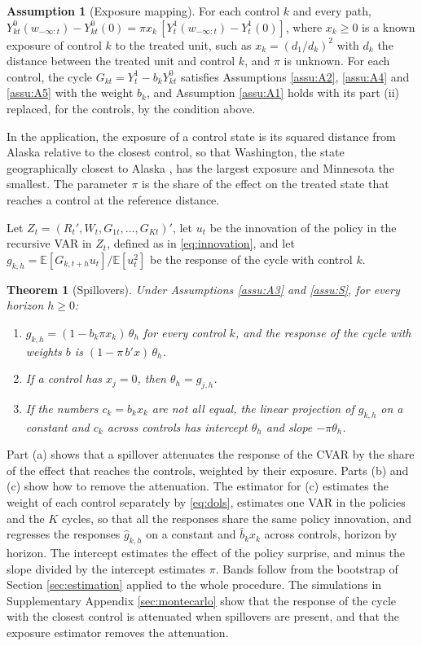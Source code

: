 \documentclass[12pt,a4paper]{article}
\newtheorem{thm}{Theorem}
\theoremstyle{definition}
\newtheorem{assumption}{Assumption}
\newcommand{\E}{\mathbb{E}}
\begin{document}
\begin{assumption}[Exposure mapping\label{assu:S}]
For each control $k$ and every path, $Y^0_{kt}(w_{-\infty:t})-Y^0_{kt}(0)=\pi x_k\,[Y^1_t(w_{-\infty:t})-Y^1_t(0)]$, where $x_k\geq0$ is a known exposure of control $k$ to the treated unit, such as $x_k=(d_1/d_k)^2$ with $d_k$ the distance between the treated unit and control $k$, and $\pi$ is unknown. For each control, the cycle $G_{kt}=Y^1_t-b_kY^0_{kt}$ satisfies Assumptions \ref{assu:A2}, \ref{assu:A4} and \ref{assu:A5} with the weight $b_k$, and Assumption \ref{assu:A1} holds with its part (ii) replaced, for the controls, by the condition above.
\end{assumption}

In the application, the exposure of a control state is its squared distance from Alaska relative to the closest control, so that Washington, the state geographically closest to Alaska \citep{Kueng2018}, has the largest exposure and Minnesota the smallest. The parameter $\pi$ is the share of the effect on the treated state that reaches a control at the reference distance.

Let $Z_t=(R_t',W_t,G_{1t},\dots,G_{Kt})'$, let $u_t$ be the innovation of the policy in the recursive VAR in $Z_t$, defined as in \eqref{eq:innovation}, and let $g_{k,h}=\E[G_{k,t+h}u_t]/\E[u_t^2]$ be the response of the cycle with control $k$.

\begin{thm}[Spillovers\label{thm:spill}]
Under Assumptions \ref{assu:A3} and \ref{assu:S}, for every horizon $h\geq0$:
\begin{enumerate}
\item[(a)] $g_{k,h}=(1-b_k\pi x_k)\,\theta_h$ for every control $k$, and the response of the cycle with weights $b$ is $(1-\pi\,b'x)\,\theta_h$.
\item[(b)] If a control has $x_j=0$, then $\theta_h=g_{j,h}$.
\item[(c)] If the numbers $c_k=b_kx_k$ are not all equal, the linear projection of $g_{k,h}$ on a constant and $c_k$ across controls has intercept $\theta_h$ and slope $-\pi\theta_h$.
\end{enumerate}
\end{thm}

Part (a) shows that a spillover attenuates the response of the CVAR by the share of the effect that reaches the controls, weighted by their exposure. Parts (b) and (c) show how to remove the attenuation. The estimator for (c) estimates the weight of each control separately by \eqref{eq:dols}, estimates one VAR in the policies and the $K$ cycles, so that all the responses share the same policy innovation, and regresses the responses $\hat g_{k,h}$ on a constant and $\hat b_kx_k$ across controls, horizon by horizon. The intercept estimates the effect of the policy surprise, and minus the slope divided by the intercept estimates $\pi$. Bands follow from the bootstrap of Section \ref{sec:estimation} applied to the whole procedure. The simulations in Supplementary Appendix \ref{sec:montecarlo} show that the response of the cycle with the closest control is attenuated when spillovers are present, and that the exposure estimator removes the attenuation.
\end{document}
